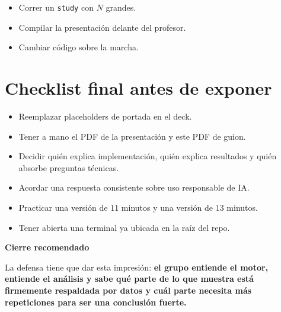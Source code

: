 \documentclass[11pt]{article}
\newcommand{\sectionbox}[1]{
  \vspace{0.4em}
  {\colorbox{tplight}{\parbox{\dimexpr\linewidth-2\fboxsep\relax}{\textbf{\color{tpblue}#1}}}}
  \vspace{0.35em}
}
\begin{document}
\begin{itemize}
  \item Correr un \texttt{study} con $N$ grandes.
  \item Compilar la presentaci\'on delante del profesor.
  \item Cambiar c\'odigo sobre la marcha.
\end{itemize}

\section{Checklist final antes de exponer}

\begin{itemize}
  \item Reemplazar placeholders de portada en el deck.
  \item Tener a mano el PDF de la presentaci\'on y este PDF de guion.
  \item Decidir qui\'en explica implementaci\'on, qui\'en explica resultados y qui\'en absorbe preguntas t\'ecnicas.
  \item Acordar una respuesta consistente sobre uso responsable de IA.
  \item Practicar una versi\'on de 11 minutos y una versi\'on de 13 minutos.
  \item Tener abierta una terminal ya ubicada en la ra\'iz del repo.
\end{itemize}

\sectionbox{Cierre recomendado}

La defensa tiene que dar esta impresi\'on: \textbf{el grupo entiende el motor, entiende el an\'alisis y sabe qu\'e parte de lo que muestra est\'a firmemente respaldada por datos y cu\'al parte necesita m\'as repeticiones para ser una conclusi\'on fuerte.}
\end{document}
